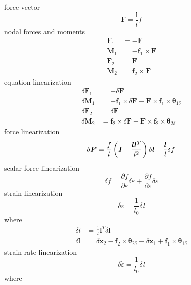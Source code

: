 \documentclass[10pt,dvips,fleqn,subeqn]{report}
\newcommand{\T}[1]{\bm{#1}}
\begin{document}
force vector
\begin{equation}
	\T{F} = \frac{\T{l}}{l} f
\end{equation}
nodal forces and moments
\begin{subequations}
\begin{align}
	\T{F}_1 &= -\T{F} \\
	\T{M}_1 &= -\T{f}_1 \times \T{F} \\
	\T{F}_2 &= \T{F} \\
	\T{M}_2 &= \T{f}_2 \times \T{F}
\end{align}
\end{subequations}
equation linearization
\begin{subequations}
\begin{align}
	\delta\T{F}_1 &= -\delta\T{F} \\
	\delta\T{M}_1 &= -\T{f}_1 \times \delta\T{F} - \T{F}\times\T{f}_1\times \T{\theta}_{1\delta} \\
	\delta\T{F}_2 &= \delta\T{F} \\
	\delta\T{M}_2 &= \T{f}_2 \times \delta\T{F} + \T{F}\times\T{f}_2\times \T{\theta}_{2\delta}
\end{align}
\end{subequations}
force linearization
\begin{equation}
	\delta\T{F} = \frac{f}{l}\plbr{\T{I} - \frac{\T{l}\T{l}^T}{l^2}} \delta\T{l} + \frac{\T{l}}{l} \delta{f}
\end{equation}
scalar force linearization
\begin{equation}
	\delta{f} = \frac{\partial{f}}{\partial\varepsilon} \delta\varepsilon
	+ \frac{\partial{f}}{\partial\dot{\varepsilon}} \delta\dot{\varepsilon}
\end{equation}
strain linearization
\begin{equation}
	\delta\varepsilon = \frac{1}{l_0}\delta{l}
\end{equation}
where
\begin{subequations}
\begin{align}
	\delta{l} &= \frac{1}{l}\T{l}^T \delta\T{l} \\
	\delta\T{l} &= \delta\T{x}_2 - \T{f}_2 \times \T{\theta}_{2\delta}
		- \delta\T{x}_1 + \T{f}_1 \times \T{\theta}_{1\delta}
\end{align}
\end{subequations}
strain rate linearization
\begin{equation}
	\delta\dot{\varepsilon} = \frac{1}{l_0} \delta\dot{l}
\end{equation}
where
\end{document}
